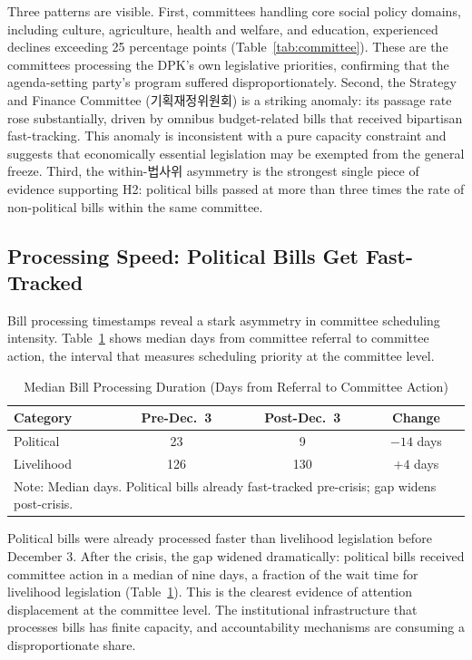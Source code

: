 \documentclass[11pt]{article}
\begin{document}
Three patterns are visible. First, committees handling core social policy domains, including culture, agriculture, health and welfare, and education, experienced declines exceeding 25 percentage points (Table~\ref{tab:committee}). These are the committees processing the DPK's own legislative priorities, confirming that the agenda-setting party's program suffered disproportionately. Second, the Strategy and Finance Committee (기획재정위원회) is a striking anomaly: its passage rate rose substantially, driven by omnibus budget-related bills that received bipartisan fast-tracking. This anomaly is inconsistent with a pure capacity constraint and suggests that economically essential legislation may be exempted from the general freeze. Third, the within-법사위 asymmetry is the strongest single piece of evidence supporting H2: political bills passed at more than three times the rate of non-political bills within the same committee.

\subsection{Processing Speed: Political Bills Get Fast-Tracked}

Bill processing timestamps reveal a stark asymmetry in committee scheduling intensity. Table~\ref{tab:speed} shows median days from committee referral to committee action, the interval that measures scheduling priority at the committee level.

\begin{table}[htbp]
\centering
\caption{Median Bill Processing Duration (Days from Referral to Committee Action)}
\label{tab:speed}
\begin{tabular}{lccc}
\toprule
Category & Pre-Dec.\ 3 & Post-Dec.\ 3 & Change \\
\midrule
Political & 23 & 9 & $-14$ days \\
Livelihood & 126 & 130 & $+4$ days \\
\bottomrule
\multicolumn{4}{l}{\footnotesize Note: Median days. Political bills already fast-tracked pre-crisis; gap widens post-crisis.}
\end{tabular}
\end{table}

Political bills were already processed faster than livelihood legislation before December 3. After the crisis, the gap widened dramatically: political bills received committee action in a median of nine days, a fraction of the wait time for livelihood legislation (Table~\ref{tab:speed}). This is the clearest evidence of attention displacement at the committee level. The institutional infrastructure that processes bills has finite capacity, and accountability mechanisms are consuming a disproportionate share.
\end{document}
